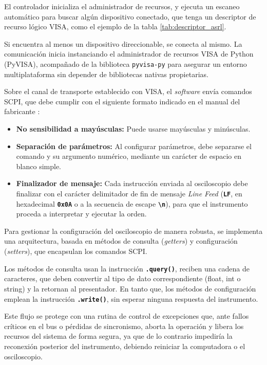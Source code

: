 El controlador inicializa el administrador de recursos, y ejecuta un escaneo automático para buscar algún dispositivo conectado, que tenga un descriptor de recurso lógico VISA, como el ejemplo de la tabla \ref{tab:descriptor_asrl}.

Si encuentra al menos un dispositivo direccionable, se conecta al mismo. La comunicación inicia instanciando el administrador de recursos VISA de Python (PyVISA), acompañado de la biblioteca \texttt{pyvisa-py} para asegurar un entorno multiplataforma sin depender de bibliotecas nativas propietarias.

Sobre el canal de transporte establecido con VISA, el \emph{software} envía comandos SCPI, que debe cumplir con el siguiente formato indicado en el manual del fabricante \cite{gds1000au_ProgrammingManual}:
\begin{itemize}
    \item \textbf{No sensibilidad a mayúsculas:} Puede usarse mayúsculas y minúsculas.
    \item \textbf{Separación de parámetros:} Al configurar parámetros, debe separarse el comando y su argumento numérico, mediante un carácter de espacio en blanco simple.
    \item \textbf{Finalizador de mensaje:} Cada instrucción enviada al osciloscopio debe finalizar con el carácter delimitador de fin de mensaje \emph{Line Feed} (\textbf{\texttt{LF}}, en hexadecimal \textbf{\texttt{0x0A}} o a la secuencia de escape \textbf{\texttt{\textbackslash n}}), para que el instrumento proceda a interpretar y ejecutar la orden.
\end{itemize}

Para gestionar la configuración del osciloscopio de manera robusta, se implementa una arquitectura, basada en métodos de consulta (\emph{getters}) y configuración (\emph{setters}), que encapsulan los comandos SCPI.

Los métodos de consulta usan la instrucción \textbf{\texttt{.query()}}, reciben una cadena de caracteres, que deben convertir al tipo de dato correspondiente (float, int o string) y la retornan al presentador. En tanto que, los métodos de configuración emplean la instrucción \textbf{\texttt{.write()}}, sin esperar ninguna respuesta del instrumento.

Este flujo se protege con una rutina de control de excepciones que, ante fallos críticos en el bus o pérdidas de sincronismo, aborta la operación y libera los recursos del sistema de forma segura, ya que de lo contrario impediría la reconexión posterior del instrumento, debiendo reiniciar la computadora o el osciloscopio.

